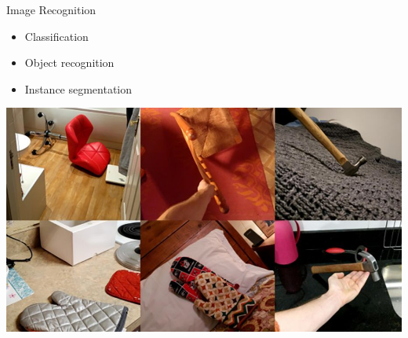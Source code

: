 \documentclass{beamer}{}
\begin{document}
        \begin{frame} {Image Recognition}
        \begin{itemize}[<+->]
           \item Classification
           \item Object recognition
           \item Instance segmentation
        \end{itemize}
        \begin{center}
        \end{center}
    \end{frame}
    \begin{frame}[plain]
        \includegraphics[width=\textwidth]{img/chaos.png}
    \end{frame}
\end{document}
